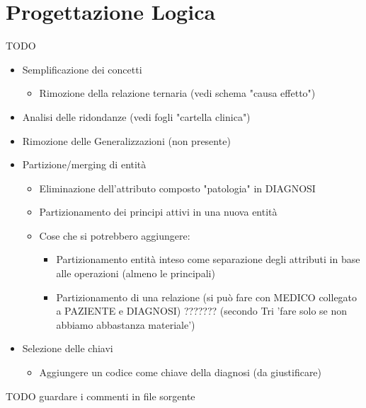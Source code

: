 \documentclass{article}
\begin{document}




\clearpage
\section{Progettazione Logica}
TODO
\begin{itemize}
  \item Semplificazione dei concetti
    \begin{itemize}
      \item Rimozione della relazione ternaria (vedi schema "causa effetto")
    \end{itemize}
  \item Analisi delle ridondanze (vedi fogli "cartella clinica")
  \item Rimozione delle Generalizzazioni (non presente)

  \item Partizione/merging di entità
    \begin{itemize}
      \item Eliminazione dell'attributo composto "patologia" in DIAGNOSI
      \item Partizionamento dei principi attivi in una nuova entità
      \item Cose che si potrebbero aggiungere:
        \begin{itemize}
          \item Partizionamento entità inteso come separazione degli attributi in base alle operazioni (almeno le principali)
          \item Partizionamento di una relazione (si può fare con MEDICO collegato a PAZIENTE e DIAGNOSI) ???????
            (secondo Tri 'fare solo se non abbiamo abbastanza materiale')
        \end{itemize}
    \end{itemize}
  \item Selezione delle chiavi
    \begin{itemize}
      \item Aggiungere un codice come chiave della diagnosi (da giustificare)
    \end{itemize}
\end{itemize}
TODO guardare i commenti in file sorgente
\end{document}

